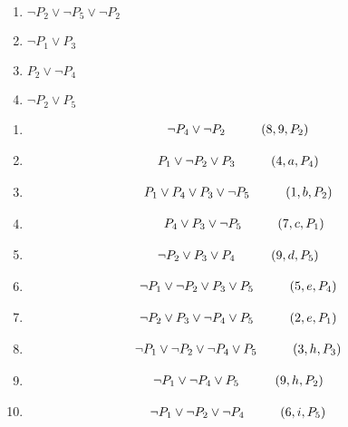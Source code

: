 \documentclass[a4paper,12pt, centered]{article}
\newcommand\tab[1][1cm]{\hspace*{#1}}
\begin{document}
\begin{enumerate}
\begin{multicols}{3}
\begin{enumerate}[(1)]
			\item $\neg P_2 \lor  \neg P_5 \lor  \neg P_2$
			\item $\neg P_1 \lor  P_3$
			\item $P_2 \lor  \neg P_4$
			\item $\neg P_2 \lor P_5$
		\end{enumerate}
	\end{multicols}
	\begin{multicols}{2}
		\begin{enumerate}
			\item \begin{align*}
				\neg P_4\lor\neg P_2\tab & (8,9,P_2)
			\end{align*}
			\item \begin{align*}
				P_1\lor\neg P_2\lor P_3\tab & (4,a,P_4)
			\end{align*}
			\item \begin{align*}
				P_1\lor P_4\lor P_3\lor\neg P_5\tab & (1,b,P_2) 
			\end{align*}		 
			\item \begin{align*}
				P_4\lor P_3\lor\neg P_5\tab (7,c,P_1)
			\end{align*}
			\item \begin{align*}
				\neg P_2 \lor P_3\lor P_4\tab & (9, d, P_5)
			\end{align*}
			\item \begin{align*}
				\neg P_1\lor\neg P_2\lor P_3\lor P_5\tab & (5,e,P_4)
			\end{align*}
			\item \begin{align*}
				\neg P_2\lor P_3\lor\neg P_4\lor P_5\tab & (2,e,P_1)
			\end{align*}
			\item \begin{align*}
				\neg P_1\lor\neg P_2\lor \neg P_4\lor P_5\tab & (3,h,P_3)
			\end{align*}
			\item \begin{align*}
				\neg P_1\lor\neg P_4\lor P_5\tab & (9,h,P_2)
			\end{align*}
			\item \begin{align*}
				\neg P_1\lor\neg P_2\lor\neg P_4\tab & (6,i,P_5) 
			\end{align*}

\end{enumerate}
\end{multicols}
\end{enumerate}
\end{document}
